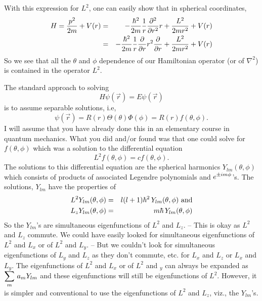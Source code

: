 With this expression for $L^2$, one can easily show that in spherical coordinates, 
\begin{eqnarray*}
H = {p^2\over2m} + V(r) &=& -{\hbar^2\over2m}{1\over r}{\partial^2\over \partial r^2} r + {L^2\over2mr^2} + V(r) \\
                                       &=& -{\hbar^2\over2m}{1\over r}{\partial\over\partial r} r^2{\partial\over\partial r} + {L^2\over2mr^2} + V(r)
\end{eqnarray*}
So we see that all the $\theta$ and $\phi$ dependence of our Hamiltonian operator (or of $\nabla^2$) is contained in the operator $L^2$. 

The standard approach to solving 
$$H\psi(\vec{r}) = E\psi(\vec{r})$$ is to assume separable solutions, i.e, 
$$\psi(\vec{r}) = R(r)\Theta(\theta)\Phi(\phi) = R(r)f(\theta, \phi).$$
I will assume that you have already done this in an elementary course in quantum mechanics. What you did and/or found was that one could 
solve for $f(\theta,\phi)$ which was a solution to the differential equation
$$L^2 f(\theta,\phi) = c f(\theta,\phi).$$
The solutions to this differential equation are the spherical harmonics $Y_{lm}(\theta,\phi)$ which consists of products of associated Legendre 
polynomials and $\displaystyle e^{\pm i m \phi}$'s. The solutions, $Y_{lm}$ have the properties of            
\begin{eqnarray*}
L^2 Y_{lm}(\theta,\phi) &=& l(l+1)\hbar^2\,Y_{lm}(\theta,\phi)\mbox{  and}\\
L_zY_{lm}(\theta,\phi)  &=& m\hbar\, Y_{lm}(\theta,\phi) 
\end{eqnarray*}                            
So the $Y_{lm}$'s are simultaneous eigenfunctions of $L^2$ and $L_z$. -- This is okay as $L^2$ and $L_z$ commute. We could have easily looked for 
simultaneous eigenfunctions of $L^2$ and $L_x$ or of $L^2$ and $L_y$. -- But we couldn't look for simultaneous eigenfunctions of $L_y$ and $L_z$ as they don't commute, etc. for $L_x$ and $L_z$ or $L_x$ and $L_y$. 
The eigenfunctions of $L^2$ and $L_x$ or of $L^2$ and $_y$ can always be expanded as $\displaystyle \sum_m\, a_m Y_{lm}$ and these eigenfunctions will still be eigenfunctions of $L^2$. However, it is simpler and conventional
to use the eigenfunctions of $L^2$ and $L_z$, viz., the $Y_{lm}$'s. 


